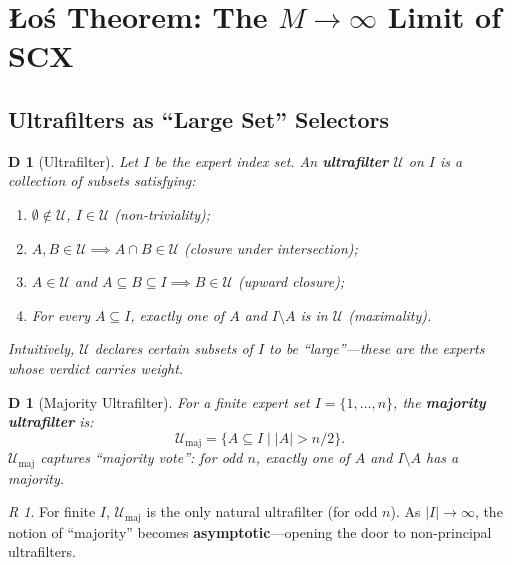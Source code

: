 \documentclass[12pt,a4paper]{article}
\newtheorem{definition}[theorem]Definition
\theoremstyle{remark}
\newtheorem{remark}[theorem]Remark
\newcommand{\Ultrafilter}{\mathcal{U}}
\begin{document}
\section{Łoś Theorem: The \(M\to\infty\) Limit of SCX}
\subsection{Ultrafilters as ``Large Set'' Selectors}
\begin{definition}[Ultrafilter]
Let \(I\) be the expert index set. An \textbf{ultrafilter} \(\Ultrafilter\) on \(I\) is a collection of subsets satisfying:
\begin{enumerate}[label=(\roman*),itemsep=2pt]
    \item \(\emptyset \notin \Ultrafilter\), \(I \in \Ultrafilter\) (non-triviality);
    \item \(A, B \in \Ultrafilter \implies A \cap B \in \Ultrafilter\) (closure under intersection);
    \item \(A \in \Ultrafilter\) and \(A \subseteq B \subseteq I \implies B \in \Ultrafilter\) (upward closure);
    \item For every \(A \subseteq I\), exactly one of \(A\) and \(I \setminus A\) is in \(\Ultrafilter\) (maximality).
\end{enumerate}
Intuitively, \(\Ultrafilter\) declares certain subsets of \(I\) to be ``large''---these are the experts whose verdict carries weight.
\end{definition}

\begin{definition}[Majority Ultrafilter]
For a finite expert set \(I = \{1,\ldots,n\}\), the \textbf{majority ultrafilter} is:
\begin{equation}
    \Ultrafilter_{\mathrm{maj}} = \{A \subseteq I \mid |A| > n/2\}.
\end{equation}
\(\Ultrafilter_{\mathrm{maj}}\) captures ``majority vote'': for odd \(n\), exactly one of \(A\) and \(I\setminus A\) has a majority.
\end{definition}

\begin{remark}
For finite \(I\), \(\Ultrafilter_{\mathrm{maj}}\) is the only natural ultrafilter (for odd \(n\)). As \(|I| \to \infty\), the notion of ``majority'' becomes \textbf{asymptotic}---opening the door to non-principal ultrafilters.
\end{remark}
\end{document}
